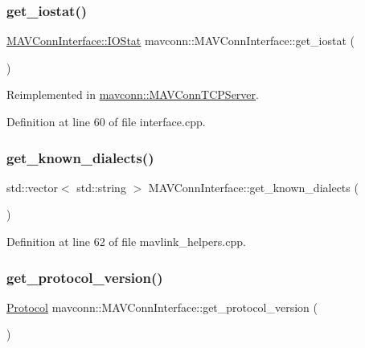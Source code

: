\subsubsection{\texorpdfstring{get\_iostat()}{get\_iostat()}\hspace{0.1cm}{\footnotesize\ttfamily [2/2]}}
{\footnotesize\ttfamily \mbox{\hyperlink{structmavconn_1_1MAVConnInterface_1_1IOStat}{M\+A\+V\+Conn\+Interface\+::\+I\+O\+Stat}} mavconn\+::\+M\+A\+V\+Conn\+Interface\+::get\+\_\+iostat (\begin{DoxyParamCaption}{ }\end{DoxyParamCaption})\hspace{0.3cm}{\ttfamily [virtual]}}



Reimplemented in \mbox{\hyperlink{group__mavconn_ga7fd83c9a2233baa30aff24b6f3c8dd25}{mavconn\+::\+M\+A\+V\+Conn\+T\+C\+P\+Server}}.



Definition at line 60 of file interface.\+cpp.

\mbox{\label{group__mavconn_ga443165dafa8e6827e340e92768a07a12}} 
\subsubsection{\texorpdfstring{get\_known\_dialects()}{get\_known\_dialects()}}
{\footnotesize\ttfamily std\+::vector$<$ std\+::string $>$ M\+A\+V\+Conn\+Interface\+::get\+\_\+known\+\_\+dialects (\begin{DoxyParamCaption}{ }\end{DoxyParamCaption})\hspace{0.3cm}{\ttfamily [static]}}



Definition at line 62 of file mavlink\+\_\+helpers.\+cpp.

\mbox{\label{group__mavconn_gaae320aaf19ca5b0c03b6febba5efdf1b}} 
\subsubsection{\texorpdfstring{get\_protocol\_version()}{get\_protocol\_version()}}
{\footnotesize\ttfamily \mbox{\hyperlink{group__mavconn_gae4e5498ebfd232dcad75be0f8a168ff3}{Protocol}} mavconn\+::\+M\+A\+V\+Conn\+Interface\+::get\+\_\+protocol\+\_\+version (\begin{DoxyParamCaption}{ }\end{DoxyParamCaption})}



